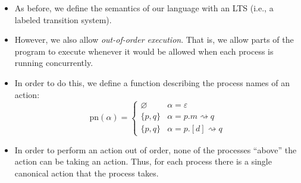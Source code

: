 \documentclass{lecturenotes}
\renewcommand{\tt}{\textsf{true}\xspace}
\newcommand{\ff}{\textsf{false}\xspace}
\newcommand{\sendrecv}[4]{\ensuremath{#1.#2 \rightsquigarrow #3.#4}}
\newcommand{\syncmsg}[3]{\ensuremath{#1.[#2] \rightsquigarrow #3}}
\newcommand{\chorif}[4]{\ensuremath{\textsf{if}~#1.#2 \mathrel{\textsf{then}} #3 \mathrel{\textsf{else}} #4}}
\newcommand{\sendrecva}[3]{\ensuremath{#1.#2 \rightsquigarrow #3}}
\newcommand{\syncmsga}[3]{\ensuremath{#1.[#2] \rightsquigarrow #3}}
\begin{document}
\begin{itemize}
{$$\begin{array}{ll}
{\begin{array}[t]{l}
        \textsf{if}~q.m'\\
        \textsf{then}~\mathcal{C}_1[p \mid x \mapsto m]\\
        \textsf{else}~\mathcal{C}_2[p \mid x \mapsto m]
      \end{array}
      }
      & \mathcal{C} = \chorif{q}{m'}{\mathcal{C}_1}{\mathcal{C}_2} \land q \neq p\\
    \end{array}
  \right.
  $$
}
\item As before, we define the semantics of our language with an LTS (i.e., a labeled transition system).
\item However, we also allow \emph{out-of-order execution}.
  That is, we allow parts of the program to execute whenever it would be allowed when each process is running concurrently.
\item In order to do this, we define a function describing the process names of an action:
  $$
  \text{pn}(\alpha) = \left\{\begin{array}{ll} \varnothing & \alpha = \varepsilon\\ \{p, q\} & \alpha = \sendrecva{p}{m}{q}\\ \{p, q\} & \alpha = \syncmsga{p}{d}{q}\end{array}\right.
  $$
\item In order to perform an action out of order, none of the processes ``above'' the action can be taking an action.
  Thus, for each process there is a single canonical action that the process takes.
\end{itemize}

\end{document}

